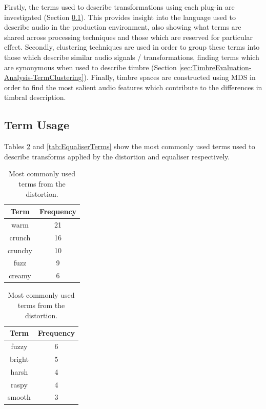 	Firstly, the terms used to describe transformations using each plug-in are investigated (Section
	\ref{sec:TimbreEvaluation-Analysis-TermUsage}). This provides insight into the language used to describe audio in
	the production environment, also showing what terms are shared across processing techniques and those which are
	reserved for particular effect. Secondly, clustering techniques are used in order to group these terms into those
	which describe similar audio signals / transformations, finding terms which are synonymous when used to describe
	timbre (Section \ref{sec:TimbreEvaluation-Analysis-TermClustering}). Finally, timbre spaces are constructed using
	MDS in order to find the most salient audio features which contribute to the differences in timbral description.

	\subsection{Term Usage}
	\label{sec:TimbreEvaluation-Analysis-TermUsage}
		Tables \ref{tab:DistortionTerms} and \ref{tab:EqualiserTerms} show the most commonly used terms used to
		describe transforms applied by the distortion and equaliser respectively.

		\begin{table}[h!]
			\centering
			\begin{tabular}{|c|c|}
				\hline
				\bf{Term} & \bf{Frequency} \\
				\hline
				\hline
				warm & 21 \\
				\hline
				crunch & 16 \\
				\hline
				crunchy & 10 \\
				\hline
				fuzz & 9 \\
				\hline
				creamy & 6 \\
				\hline
			\end{tabular}
			\qquad
			\begin{tabular}{|c|c|}
				\hline
				\bf{Term} & \bf{Frequency} \\
				\hline
				\hline
				fuzzy & 6 \\
				\hline
				bright & 5 \\
				\hline
				harsh & 4 \\
				\hline
				raspy & 4 \\
				\hline
				smooth & 3 \\
				\hline
			\end{tabular}
			\caption{Most commonly used terms from the distortion.}
			\label{tab:DistortionTerms}
		\end{table}

